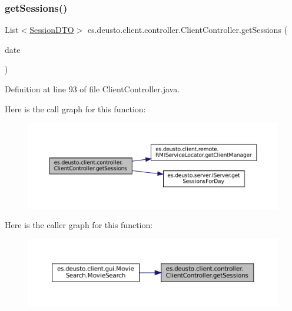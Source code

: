 \subsubsection{\texorpdfstring{getSessions()}{getSessions()}}
{\footnotesize\ttfamily List$<$\mbox{\hyperlink{classes_1_1deusto_1_1server_1_1data_1_1_session_d_t_o}{Session\+D\+TO}}$>$ es.\+deusto.\+client.\+controller.\+Client\+Controller.\+get\+Sessions (\begin{DoxyParamCaption}\item[{Local\+Date}]{date }\end{DoxyParamCaption})}



Definition at line 93 of file Client\+Controller.\+java.

Here is the call graph for this function\+:
\nopagebreak
\begin{figure}[H]
\begin{center}
\leavevmode
\includegraphics[width=350pt]{classes_1_1deusto_1_1client_1_1controller_1_1_client_controller_a06a84e0834fb21c31f4988e26ee6dedf_cgraph}
\end{center}
\end{figure}
Here is the caller graph for this function\+:
\nopagebreak
\begin{figure}[H]
\begin{center}
\leavevmode
\includegraphics[width=350pt]{classes_1_1deusto_1_1client_1_1controller_1_1_client_controller_a06a84e0834fb21c31f4988e26ee6dedf_icgraph}
\end{center}
\end{figure}
\mbox{\label{classes_1_1deusto_1_1client_1_1controller_1_1_client_controller_ac1bd9affe27668ee49320daae38d67a0}} 
